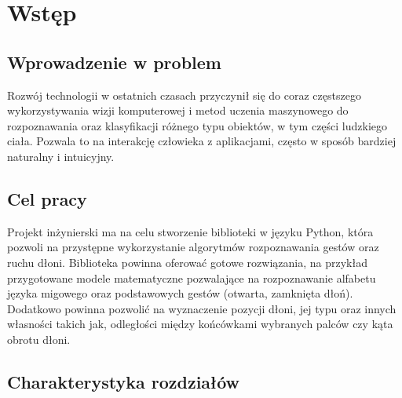 \chapter{Wstęp}

\section{Wprowadzenie w problem}
\quad Rozwój technologii w ostatnich czasach przyczynił się do coraz częstszego wykorzystywania wizji komputerowej i metod uczenia maszynowego do rozpoznawania oraz klasyfikacji różnego typu obiektów, w tym części ludzkiego ciała. Pozwala to na interakcję człowieka z aplikacjami, często w sposób bardziej naturalny i intuicyjny. 

\section{Cel pracy}
Projekt inżynierski ma na celu stworzenie biblioteki w języku Python, która pozwoli na przystępne wykorzystanie algorytmów rozpoznawania gestów oraz ruchu dłoni. Biblioteka powinna oferować gotowe rozwiązania, na przykład przygotowane modele matematyczne pozwalające na rozpoznawanie alfabetu języka migowego oraz podstawowych gestów (otwarta, zamknięta dłoń). Dodatkowo powinna pozwolić na wyznaczenie pozycji dłoni, jej typu oraz innych własności takich jak, odległości między końcówkami wybranych palców czy kąta obrotu dłoni. 


\newpage
\section {Charakterystyka rozdziałów}

